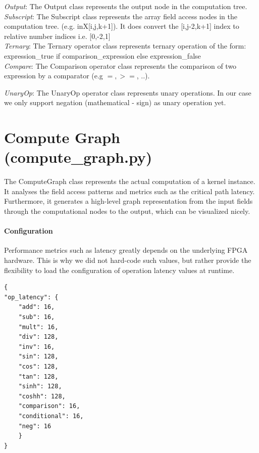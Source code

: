 \textit{Output}: The Output class represents the output node in the computation tree. \\

\textit{Subscript}: The Subscript class represents the array field access nodes in the computation tree. (e.g. inX[i,j,k+1]). It does convert the [i,j-2,k+1] index to relative number indices i.e. [0,-2,1] \\

\textit{Ternary}: The Ternary operator class represents ternary operation of the form:
expression\_true if comparison\_expression else expression\_false \\

\textit{Compare}: The Comparison operator class represents the comparison of two expression by a comparator (e.g $=, >=$, ..).

\textit{UnaryOp}: The UnaryOp operator class represents unary operations. In our case we only support negation (mathematical - sign) as unary operation yet.





\section{Compute Graph (compute\_graph.py)}
The ComputeGraph class represents the actual computation of a kernel instance. It analyses the field access patterns and metrics such as the critical path latency. Furthermore, it generates a high-level graph representation from the input fields through the computational nodes to the output, which can be visualized nicely.


\paragraph{Configuration}
Performance metrics such as latency greatly depends on the underlying FPGA hardware. This is why we did not hard-code such values, but rather provide the flexibility to load the configuration of operation latency values at runtime. 
\begin{verbatim}
{
"op_latency": {
	"add": 16,
	"sub": 16,
	"mult": 16,
	"div": 128,
	"inv": 16,
	"sin": 128,
	"cos": 128,
	"tan": 128,
	"sinh": 128,
	"coshh": 128,
	"comparison": 16,
	"conditional": 16,
	"neg": 16
	}
}
\end{verbatim}


